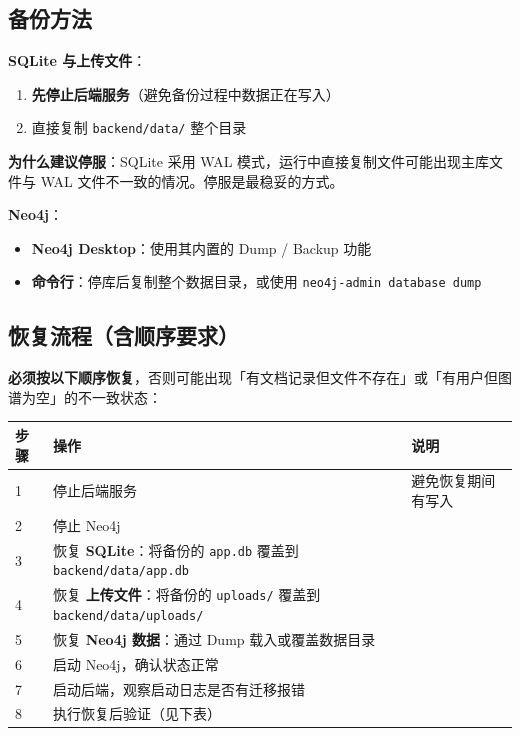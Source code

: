 \documentclass[UTF8,a4paper,11pt]{ctexrep}
\begin{document}
\subsection{备份方法}

\textbf{SQLite 与上传文件}：

\begin{enumerate}
\item \textbf{先停止后端服务}（避免备份过程中数据正在写入）
\item 直接复制 \texttt{backend/data/} 整个目录
\end{enumerate}
\begin{notebox}
\textbf{为什么建议停服}：SQLite 采用 WAL 模式，运行中直接复制文件可能出现主库文件与 WAL 文件不一致的情况。停服是最稳妥的方式。

\end{notebox}

\textbf{Neo4j}：

\begin{itemize}
\item \textbf{Neo4j Desktop}：使用其内置的 Dump / Backup 功能
\item \textbf{命令行}：停库后复制整个数据目录，或使用 \texttt{neo4j-admin database dump}
\end{itemize}

\subsection{恢复流程（含顺序要求）}

\textbf{必须按以下顺序恢复}，否则可能出现「有文档记录但文件不存在」或「有用户但图谱为空」的不一致状态：

\begin{center}
\small
\begin{tabularx}{\linewidth}{@{}XXX@{}}
\toprule
步骤 & 操作 & 说明 \\
\midrule
1 & 停止后端服务 & 避免恢复期间有写入 \\
2 & 停止 Neo4j &  \\
3 & 恢复 \textbf{SQLite}：将备份的 \texttt{app.db} 覆盖到 \texttt{backend/data/app.db} &  \\
4 & 恢复 \textbf{上传文件}：将备份的 \texttt{uploads/} 覆盖到 \texttt{backend/data/uploads/} &  \\
5 & 恢复 \textbf{Neo4j 数据}：通过 Dump 载入或覆盖数据目录 &  \\
6 & 启动 Neo4j，确认状态正常 &  \\
7 & 启动后端，观察启动日志是否有迁移报错 &  \\
8 & 执行恢复后验证（见下表） &  \\
\bottomrule
\end{tabularx}
\end{center}
\end{document}
